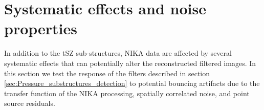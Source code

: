 \documentclass[twocolumn,traditabstract]{aa}
\begin{document}
\section{Systematic effects and noise properties}\label{sec:Systematics_and_noise_properties}
In addition to the tSZ sub-structures, NIKA data are affected by several systematic effects that can potentially alter the reconstructed filtered images. In this section we test the response of the filters described in section \ref{sec:Pressure_substructures_detection} to potential bouncing artifacts due to the transfer function of the NIKA processing, spatially correlated noise, and point source residuals.
\end{document}
